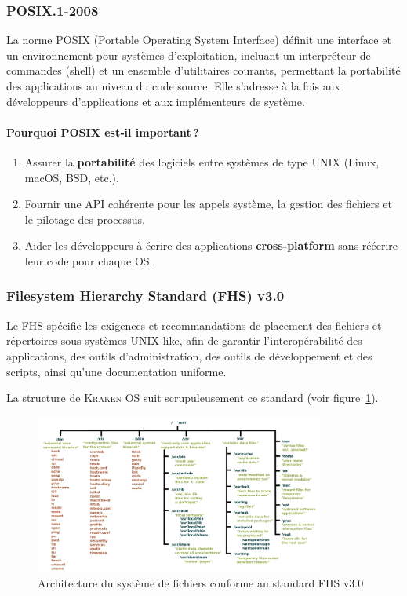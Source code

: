 \subsubsection{POSIX.1-2008}
\label{sssec:posix}
La norme POSIX (Portable Operating System Interface) définit une interface et un environnement pour systèmes d’exploitation, incluant un interpréteur de commandes (shell) et un ensemble d’utilitaires courants, permettant la portabilité des applications au niveau du code source. Elle s’adresse à la fois aux développeurs d’applications et aux implémenteurs de système.

\paragraph{Pourquoi POSIX est‑il important ?}
\begin{enumerate}
  \item Assurer la \textbf{portabilité} des logiciels entre systèmes de type UNIX (Linux, macOS, BSD, etc.).
  \item Fournir une API cohérente pour les appels système, la gestion des fichiers et le pilotage des processus.
  \item Aider les développeurs à écrire des applications \textbf{cross‑platform} sans réécrire leur code pour chaque OS.
\end{enumerate}


\subsubsection{Filesystem Hierarchy Standard (FHS) v3.0}
\label{sssec:fhs}
Le FHS spécifie les exigences et recommandations de placement des fichiers et répertoires sous systèmes UNIX-like, afin de garantir l’interopérabilité des applications, des outils d’administration, des outils de développement et des scripts, ainsi qu’une documentation uniforme.  



La structure de \textsc{Kraken OS} suit scrupuleusement ce standard (voir figure~\ref{fig:fsl}).

\begin{figure}[H]
  \centering
  \includegraphics[width=0.85\textwidth]{images_pfe/fslinux.png}
  \caption{Architecture du système de fichiers conforme au standard FHS v3.0}
  \label{fig:fsl}
\end{figure}




